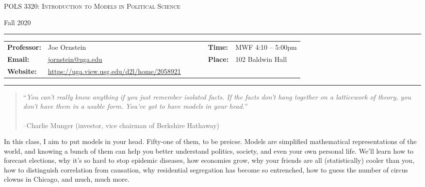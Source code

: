 \documentclass[11pt, letterpaper]{article}
\begin{document}
\begin{center}
{\Large \textsc{POLS 3320: Introduction to Models in Political Science}}
\end{center}
\begin{center}
{\large Fall 2020}
\end{center}

\begin{center}
\rule{6.5in}{0.4pt}
\begin{minipage}[t]{.96\textwidth}
\begin{tabular}{llcccll}
\textbf{Professor:} & Joe Ornstein & & &  & \textbf{Time:} & MWF 4:10 -- 5:00pm \\
\textbf{Email:} &  \href{mailto:jornstein@uga.edu}{jornstein@uga.edu} & & & & \textbf{Place:} & 102 Baldwin Hall\\
\textbf{Website:} & \href{https://uga.view.usg.edu/d2l/home/2058921}{https://uga.view.usg.edu/d2l/home/2058921} & & & & &
\end{tabular}
\end{minipage}
\rule{6.5in}{0.4pt}
\end{center}
\vspace{.15cm}
\setlength{\unitlength}{1in}
\renewcommand{\arraystretch}{2}

\begin{quotation}
	\noindent``\textit{You can't really know anything if you just remember isolated facts. If the facts don't hang together on a latticework of theory, you don't have them in a usable form. You've got to have models in your head.}''\\
	\\
	--Charlie Munger (investor, vice chairman of Berkshire Hathaway)
\end{quotation}

\noindent In this class, I aim to put models in your head. Fifty-one of them, to be preicse. Models are simplified mathematical representations of the world, and knowing a bunch of them can help you better understand politics, society, and even your own personal life. We'll learn how to forecast elections, why it's so hard to stop epidemic diseases, how economies grow, why your friends are all (statistically) cooler than you, how to distinguish correlation from causation, why residential segregation has become so entrenched, how to guess the number of circus clowns in Chicago, and much, much more. 
\end{document}
